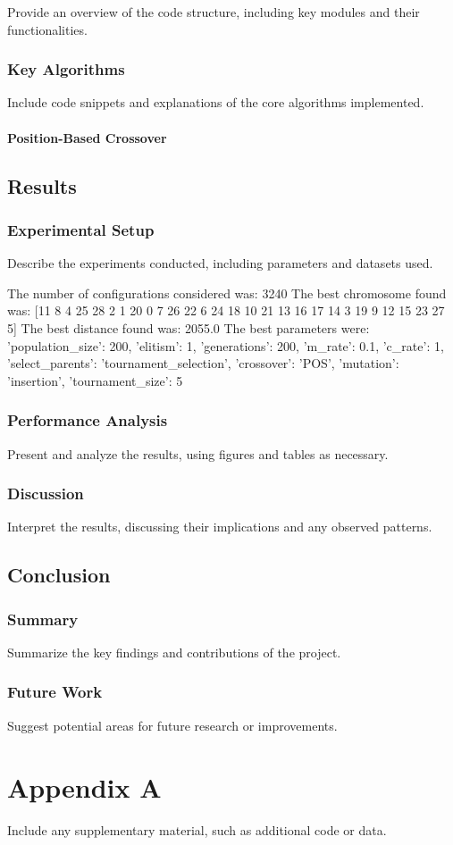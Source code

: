 \documentclass[12pt]{article}
\begin{document}
Provide an overview of the code structure, including key modules and their functionalities. 

\subsection{Key Algorithms}
Include code snippets and explanations of the core algorithms implemented. 

\subsubsection{Position-Based Crossover}


\section{Results}
\subsection{Experimental Setup}
Describe the experiments conducted, including parameters and datasets used.


The number of configurations considered was: 3240
The best chromosome found was: [11  8  4 25 28  2  1 20  0  7 26 22  6 24 18 10 21 13 16 17 14  3 19  9
 12 15 23 27  5]
The best distance found was: 2055.0
The best parameters were: {'population_size': 200, 'elitism': 1, 'generations': 200, 'm_rate': 0.1, 'c_rate': 1, 'select_parents': 'tournament_selection', 'crossover': 'POS', 'mutation': 'insertion', 'tournament_size': 5}


\subsection{Performance Analysis}
Present and analyze the results, using figures and tables as necessary.

\subsection{Discussion}
Interpret the results, discussing their implications and any observed patterns.

\section{Conclusion}
\subsection{Summary}
Summarize the key findings and contributions of the project.

\subsection{Future Work}
Suggest potential areas for future research or improvements.

\newpage
\printbibliography

\appendix
\chapter{Appendix A}
Include any supplementary material, such as additional code or data.
\end{document}
